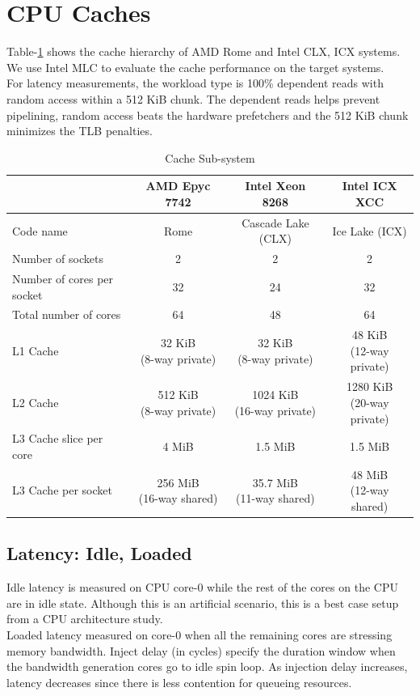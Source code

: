 \documentclass{article}
\begin{document}
\clearpage
\section{CPU Caches}
Table-\ref{table:cache_subsystem} shows the cache hierarchy of AMD Rome and Intel CLX, ICX systems. We use Intel MLC to evaluate the cache performance on the target systems.\\
For latency measurements, the workload type is 100\% dependent reads with random access within a 512 KiB chunk. The dependent reads helps prevent pipelining, random access beats the hardware prefetchers and the 512 KiB chunk minimizes the TLB penalties.
\begin{table}[h!]
\centering
 \begin{tabular}{|l|c|c|c|} \hline
& AMD Epyc 7742 & Intel Xeon 8268 & Intel ICX XCC \\\hline
Code name & Rome & Cascade Lake (CLX) & Ice Lake (ICX) \\ \hline
Number of sockets & 2 & 2 & 2 \\ \hline
Number of cores per socket & 32 & 24 & 32 \\ \hline
Total number of cores & 64 & 48 & 64 \\ \hline
L1 Cache & \makecell{32 KiB\\(8-way private)} & \makecell{32 KiB\\(8-way private)} & \makecell{48 KiB\\(12-way private)}\\ \hline
L2 Cache & \makecell{512 KiB\\(8-way private)} & \makecell{1024 KiB\\(16-way private)} & \makecell{1280 KiB\\(20-way private)} \\ \hline
L3 Cache slice per core & 4 MiB & 1.5 MiB & 1.5 MiB \\ \hline
L3 Cache per socket & \makecell{256 MiB\\(16-way shared)} & \makecell{35.7 MiB\\(11-way shared)} & \makecell{48 MiB\\(12-way shared)}\\ \hline
\end{tabular}
\caption{Cache Sub-system}
\label{table:cache_subsystem}
\end{table}


\subsection{Latency: Idle, Loaded}
Idle latency is measured on CPU core-0 while the rest of the cores on the CPU are in idle state. Although this is an artificial scenario, this is a best case setup from a CPU architecture study. \\
Loaded latency measured on core-0 when all the remaining cores are stressing memory bandwidth. Inject delay (in cycles) specify the duration window when the bandwidth generation cores go to idle spin loop. As injection delay increases, latency decreases since there is less contention for queueing resources. 
\end{document}
